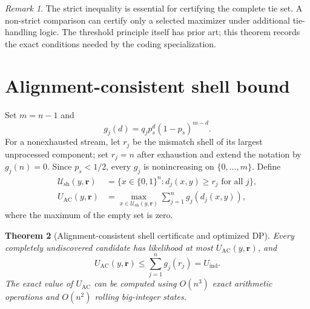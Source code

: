 \documentclass[11pt]{article}
\newtheorem{theorem}{Theorem}
\theoremstyle{remark}
\newtheorem{remark}[theorem]{Remark}
\begin{document}
\begin{remark}
The strict inequality is essential for certifying the complete tie set. A non-strict
comparison can certify only a selected maximizer under additional tie-handling logic.
The threshold principle itself has prior art; this theorem records the exact conditions
needed by the coding specialization.
\end{remark}


\section{Alignment-consistent shell bound}

Set $m=n-1$ and
\[
 g_j(d)=q_jp_s^d(1-p_s)^{m-d}.
\]
For a nonexhausted stream, let $r_j$ be the mismatch shell of its largest unprocessed
component; set $r_j=n$ after exhaustion and extend the notation by $g_j(n)=0$. Since
$p_s<1/2$, every $g_j$ is nonincreasing on $\{0,\ldots,m\}$.
Define
\begin{align*}
 \mathcal U_{\mathrm{sh}}(y,\mathbf r)
 &=\{x\in\{0,1\}^n:d_j(x,y)\ge r_j\text{ for all }j\},\\
 U_{\mathrm{AC}}(y,\mathbf r)
 &=\max_{x\in\mathcal U_{\mathrm{sh}}(y,\mathbf r)}
 \sum_{j=1}^{n}g_j(d_j(x,y)),
\end{align*}
where the maximum of the empty set is zero.

\begin{theorem}[Alignment-consistent shell certificate and optimized DP]
Every completely undiscovered candidate has likelihood at most
$U_{\mathrm{AC}}(y,\mathbf r)$, and
\[
 U_{\mathrm{AC}}(y,\mathbf r)
 \le\sum_{j=1}^{n}g_j(r_j)=U_{\mathrm{ind}}.
\]
The exact value of $U_{\mathrm{AC}}$ can be computed using $O(n^3)$ exact arithmetic operations and $O(n^2)$ rolling big-integer states.
\end{theorem}
\end{document}
